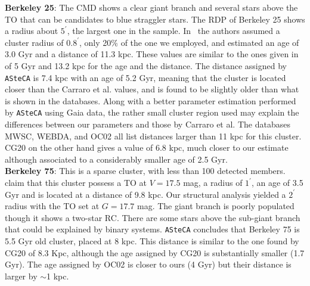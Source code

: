\documentclass{aa}
\begin{document}
\begin{appendix}
  \noindent \textbf{Berkeley 25}: The CMD shows a clear giant branch and several stars
  above the TO that can be candidates to blue straggler stars. The RDP of
  Berkeley 25 shows a radius about $5^{\prime}$, the largest one in the sample.
  In~\cite{Carraro_2005} the authors assumed a cluster radius of $0.8^{\prime}$,
  only 20\% of the one we employed, and estimated an age of 3.0 Gyr and a
  distance of 11.3 kpc. These values are similar to the ones given
  in~\cite{Carraro_2007_oldOC} of 5 Gyr and 13.2 kpc for the age and the
  distance.
  The distance assigned by \texttt{ASteCA} is 7.4 kpc with an age of 5.2 Gyr,
  meaning that the cluster is located closer than the Carraro et al.
  values, and is found to be slightly older than what is shown in the
  databases.
  Along with a better parameter estimation performed by \texttt{ASteCA} using
  Gaia data, the rather small cluster region used may explain the differences
  between our parameters and those by Carraro et al. The databases MWSC,
  WEBDA, and OC02 all list distances larger than 11 kpc for this cluster. CG20
  on the other hand gives a value of 6.8 kpc, much closer to our estimate
  although associated to a considerably smaller age of 2.5 Gyr.\\

  \noindent \textbf{Berkeley 75}: This is a sparse cluster, with less than 100
  detected members. \cite{Carraro_2005} claim that this cluster possess
  a TO at $V= 17.5$ mag, a radius of $1^{\prime}$, an age of 3.5 Gyr and is
  located at a distance of 9.8 kpc.
  Our structural analysis yielded a $2^{\prime}$ radius with the TO set at
  $G=17.7$ mag. The giant branch is poorly populated though it shows a two-star
  RC. There are some stars above the sub-giant branch that could be explained
  by binary systems. \texttt{ASteCA} concludes that Berkeley 75 is 5.5 Gyr old
  cluster, placed at 8 kpc. This distance is similar to the one found by CG20
  of 8.3 Kpc, although the age assigned by CG20 is substantially smaller (1.7
  Gyr). The age assigned by OC02 is closer to ours (4 Gyr) but their distance is
  larger by $\sim$1 kpc.\\


\end{appendix}
\end{document}
